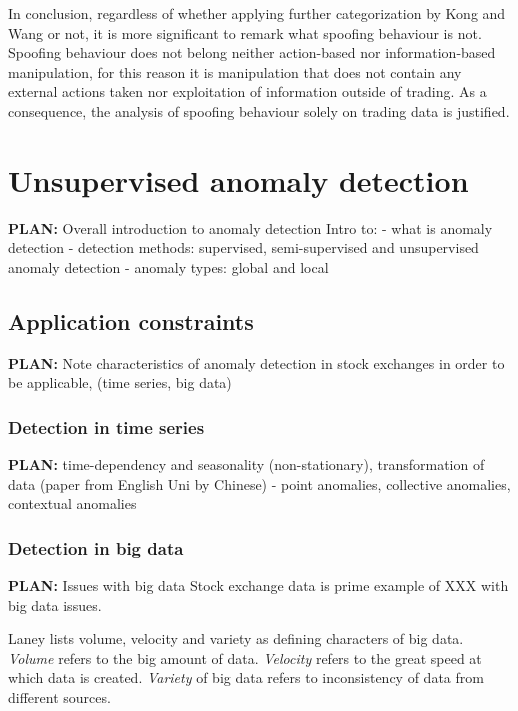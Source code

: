 \documentclass{tut-thesis}
\begin{document}
In conclusion, regardless of whether applying further categorization by Kong and Wang or not, it is more significant to remark what spoofing behaviour is not. Spoofing behaviour does not belong neither action-based nor information-based manipulation, for this reason it is manipulation that does not contain any external actions taken nor exploitation of information outside of trading. As a consequence, the analysis of spoofing behaviour solely on trading data is justified.



\chapter{Unsupervised anomaly detection}
\textbf{PLAN:} Overall introduction to anomaly detection
Intro to:
- what is anomaly detection
- detection methods: supervised, semi-supervised and unsupervised anomaly detection
- anomaly types: global and local

\section{Application constraints}
\textbf{PLAN:} Note characteristics of anomaly detection in stock exchanges in order to be applicable, (time series, big data)

\subsection{Detection in time series}
\textbf{PLAN:} time-dependency and seasonality (non-stationary), transformation of data (paper from English Uni by Chinese)
- point anomalies, collective anomalies, contextual anomalies

\subsection{Detection in big data}
\textbf{PLAN:} Issues with big data
Stock exchange data is prime example of XXX with big data issues.

Laney \autocite*{Laney2001} lists volume, velocity and variety as defining characters of big data. 
\textit{Volume} refers to the big amount of data.
\textit{Velocity} refers to the great speed at which data is created.
\textit{Variety} of big data refers to inconsistency of data from different sources. 
\end{document}

